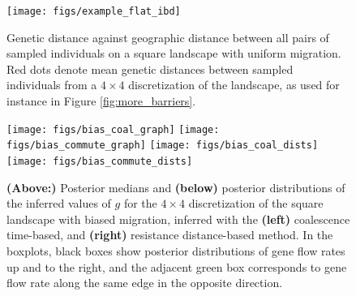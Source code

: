 \documentclass{article}
\begin{document}
\begin{figure}
\centering
     \texttt{[image: figs/example\_flat\_ibd]}
    \caption{
        Genetic distance against geographic distance
        between all pairs of sampled individuals
        on a square landscape with uniform migration.
        Red dots denote mean genetic distances
        between sampled individuals from a $4 \times 4$ discretization of the landscape,
        as used for instance in Figure \ref{fig:more_barriers}.
    \label{fig:ibd_comp}
    }
\end{figure}

\begin{figure}
\centering
    \texttt{[image: figs/bias\_coal\_graph]}
    \texttt{[image: figs/bias\_commute\_graph]}
    \texttt{[image: figs/bias\_coal\_dists]}
    \texttt{[image: figs/bias\_commute\_dists]}
\caption{
    \textbf{(Above:)} Posterior medians and \textbf{(below)} posterior distributions
    of the inferred values of $g$ 
    for the $4 \times 4$ discretization 
    of the square landscape with biased migration,
    inferred with the
    \textbf{(left)} coalescence time-based,
    and \textbf{(right)} resistance distance-based method. 
    In the boxplots,
    black boxes show posterior distributions of gene flow rates up and to the right,
    and the adjacent green box corresponds to gene flow rate along the same edge
    in the opposite direction. 
    }
\label{fig:grid_bias_4x4_1}
\end{figure}
\end{document}
